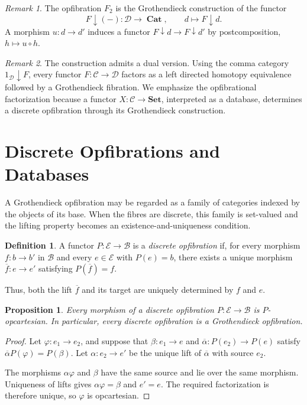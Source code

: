 \documentclass[12pt]{amsart}
\newtheorem{prop}[teo]{Proposition}
\theoremstyle{definition}
\newtheorem{definition}[teo]{Definition}
\theoremstyle{remark}
\newtheorem{remark}{Remark}
\numberwithin{figure}{section}%
\newcommand{\Ba}{\mathcal{B}}
\newcommand{\CC}{\mathcal{C}}
\newcommand{\cat}{\mathop{\mathbf{Cat}}}
\newcommand{\Dc}{\mathcal{D}}
\newcommand{\E}{\mathcal{E}}
\newcommand{\Sets}{\mathbf{Set}}
\begin{document}
\begin{remark}
The opfibration \(F_2\) is the Grothendieck construction of the functor
\[
F\downarrow(-)\colon\Dc\longrightarrow\cat,
\qquad
d\longmapsto F\downarrow d.
\]
A morphism \(u\colon d\to d'\) induces a functor
\(F\downarrow d\to F\downarrow d'\) by postcomposition,
\(h\mapsto u\circ h\).
\end{remark}

\begin{remark}
The construction admits a dual version. Using the comma category
\(1_\Dc\downarrow F\), every functor \(F\colon\CC\to\Dc\) factors as a
left directed homotopy equivalence followed by a Grothendieck fibration.
We emphasize the opfibrational factorization because a functor
\(X\colon\CC\to\Sets\), interpreted as a database, determines a discrete
opfibration through its Grothendieck construction.
\end{remark}
\section{Discrete Opfibrations and Databases}
\label{sec:discrete_opfibrations_databases}

A Grothendieck opfibration may be regarded as a family of categories indexed
by the objects of its base. When the fibres are discrete, this family is
set-valued and the lifting property becomes an existence-and-uniqueness
condition.

\begin{definition}\label{def:discrete_opfibration}
A functor \(P\colon\E\to\Ba\) is a \emph{discrete opfibration} if, for every
morphism \(f\colon b\to b'\) in \(\Ba\) and every \(e\in\E\) with
\(P(e)=b\), there exists a unique morphism
\(\overline f\colon e\to e'\) satisfying \(P(\overline f)=f\).
\end{definition}

Thus, both the lift \(\overline f\) and its target are uniquely determined
by \(f\) and \(e\).

\begin{prop}\label{prop:unique_lifts_are_opcartesian}
Every morphism of a discrete opfibration \(P\colon\E\to\Ba\) is
\(P\)-opcartesian. In particular, every discrete opfibration is a
Grothendieck opfibration.
\end{prop}

\begin{proof}
Let \(\varphi\colon e_1\to e_2\), and suppose that
\(\beta\colon e_1\to e\) and
\(\overline\alpha\colon P(e_2)\to P(e)\) satisfy
\(\overline\alpha P(\varphi)=P(\beta)\). Let
\(\alpha\colon e_2\to e'\) be the unique lift of
\(\overline\alpha\) with source \(e_2\).

The morphisms \(\alpha\varphi\) and \(\beta\) have the same source and lie
over the same morphism. Uniqueness of lifts gives
\(\alpha\varphi=\beta\) and \(e'=e\). The required factorization is
therefore unique, so \(\varphi\) is opcartesian.
\end{proof}
\end{document}
